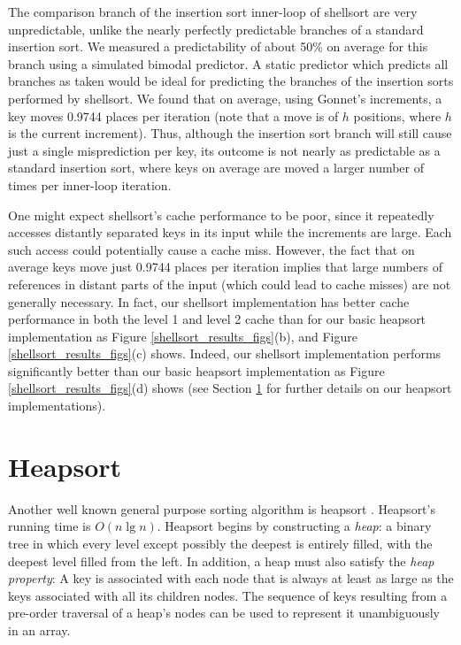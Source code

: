 \documentclass[acmtocl]{acmtrans2m}
\begin{document}
The comparison branch of the insertion sort inner-loop of shellsort are very
unpredictable, unlike the nearly perfectly predictable branches of a standard
insertion sort.  We measured a predictability of about 50\% on average for this
branch using a simulated bimodal predictor.  A static predictor which predicts
all branches as taken would be ideal for predicting the branches of the
insertion sorts performed by shellsort.  We found that on average, using
Gonnet's increments, a key moves 0.9744 places per iteration (note that a move
is of $h$ positions, where $h$ is the current increment). Thus, although the
insertion sort branch will still cause just a single misprediction per key, its
outcome is not nearly as predictable as a standard insertion sort, where keys on
average are moved a larger number of times per inner-loop iteration.

One might expect shellsort's cache performance to be poor, since it repeatedly
accesses distantly separated keys in its input while the increments are large.
Each such access could potentially cause a cache miss. However, the fact that on
average keys move just 0.9744 places per iteration implies that large numbers of
references in distant parts of the input (which could lead to cache misses) are
not generally necessary.  In fact, our shellsort implementation has better cache
performance in both the level 1 and level 2 cache than for our basic heapsort
implementation as Figure \ref{shellsort_results_figs}(b), and Figure
\ref{shellsort_results_figs}(c) shows.  Indeed, our shellsort implementation
performs significantly better than our basic heapsort implementation as Figure
\ref{shellsort_results_figs}(d) shows (see Section \ref{heapsort} for further
details on our heapsort implementations).

\section{Heapsort}
\label{heapsort}

Another well known general purpose sorting algorithm is heapsort
\cite{Williams64}. Heapsort's running time is $O(n \lg n)$.  Heapsort begins by
constructing a \textit{heap}: a binary tree in which every level except possibly
the deepest is entirely filled, with the deepest level filled from the left. In
addition, a heap must also satisfy the \textit{heap property}: A key is
associated with each node that is always at least as large as the keys
associated with all its children nodes. The sequence of keys resulting from a
pre-order traversal of a heap's nodes can be used to represent it unambiguously
in an array. 
\end{document}
